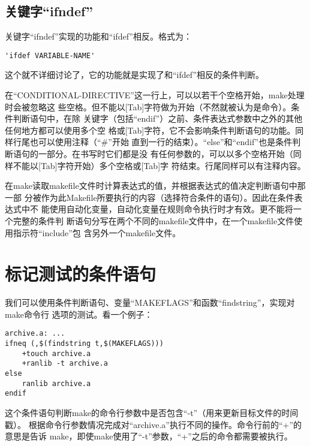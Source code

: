 \subsection{关键字“ifndef”}
关键字“ifndef”实现的功能和“ifdef”相反。格式为：
\begin{Verbatim}[]
'ifdef VARIABLE-NAME'
\end{Verbatim}
这个就不详细讨论了，它的功能就是实现了和“ifdef”相反的条件判断。

在“CONDITIONAL-DIRECTIVE”这一行上，可以以若干个空格开始，make处理时会被忽略这
些空格。但不能以[Tab]字符做为开始（不然就被认为是命令）。条件判断语句中，在除
关键字（包括“endif”）之前、条件表达式参数中之外的其他任何地方都可以使用多个空
格或[Tab]字符，它不会影响条件判断语句的功能。同样行尾也可以使用注释（“\#”开始
直到一行的结束）。“else”和“endif”也是条件判断语句的一部分。在书写时它们都是没
有任何参数的，可以以多个空格开始（同样不能以[Tab]字符开始）多个空格或[Tab]字
符结束。行尾同样可以有注释内容。

在make读取makefile文件时计算表达式的值，并根据表达式的值决定判断语句中那一部
分被作为此Makefile所要执行的内容（选择符合条件的语句）。因此在条件表达式中不
能使用自动化变量，自动化变量在规则命令执行时才有效。更不能将一个完整的条件判
断语句分写在两个不同的makefile文件中，在一个makefile文件使用指示符“include”包
含另外一个makefile文件。

\section{标记测试的条件语句}
我们可以使用条件判断语句、变量“MAKEFLAGS”和函数“findstring”，实现对make命令行
选项的测试。看一个例子：
\begin{Verbatim}[]
archive.a: ...
ifneq (,$(findstring t,$(MAKEFLAGS)))
    +touch archive.a
    +ranlib -t archive.a
else
    ranlib archive.a
endif
\end{Verbatim}

这个条件语句判断make的命令行参数中是否包含“-t”（用来更新目标文件的时间戳）。
根据命令行参数情况完成对“archive.a”执行不同的操作。命令行前的“+”的意思是告诉
make，即使make使用了“-t”参数，“+”之后的命令都需要被执行。
